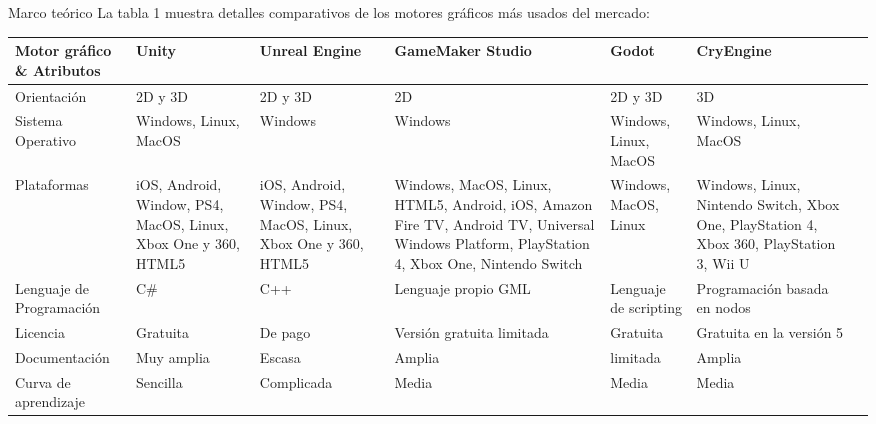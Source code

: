 \begin{thesischapter}{1} {Marco teórico}
    \vspace{10pt}
    La tabla 1 muestra detalles comparativos de los motores gráficos más usados del mercado:
    \begin{table}[ht]
        \centering
        \begin{tabularx}{\textwidth}{|X|X|X|X|X|X|X|}
            \hline
            \textbf{Motor gráfico  \& Atributos} & \textbf{Unity} & \textbf{Unreal Engine} & \textbf{GameMaker Studio} & \textbf{Godot} & \textbf{CryEngine}\\\hline
            Orientación                 & 2D y 3D                                                       &2D y 3D                                                          & 2D                            & 2D y 3D               & 3D \\\hline
            Sistema Operativo           & Windows, Linux, MacOS                                           & Windows                                                         & Windows                       & Windows, Linux, MacOS               & Windows, Linux, MacOS\\\hline
            Plataformas                 & iOS, Android, Window, PS4, MacOS,  Linux, Xbox One y 360, HTML5 & iOS, Android, Window, PS4, MacOS,  Linux, Xbox One y 360, HTML5   & Windows, MacOS, Linux, HTML5, Android, iOS, Amazon Fire TV, Android TV, Universal Windows Platform, PlayStation 4, Xbox One, Nintendo Switch    & Windows, MacOS, Linux    & Windows, Linux, Nintendo Switch, Xbox One, PlayStation 4, Xbox 360, PlayStation 3, Wii U\\\hline
            Lenguaje de Programación    & C\#                                                           & C++                                                             & Lenguaje propio GML           & Lenguaje de scripting & Programación basada en nodos \\\hline
            Licencia                    & Gratuita                                                      & De pago                                                         & Versión gratuita limitada     & Gratuita              &  Gratuita en la versión 5\\\hline
            Documentación               & Muy amplia                                                    & Escasa                                                          & Amplia                        & limitada              & Amplia\\\hline
            Curva de aprendizaje        & Sencilla                                                      & Complicada                                                      & Media                         & Media                 & Media \\\hline
            

\end{tabularx}
\end{table}
\end{thesischapter}

